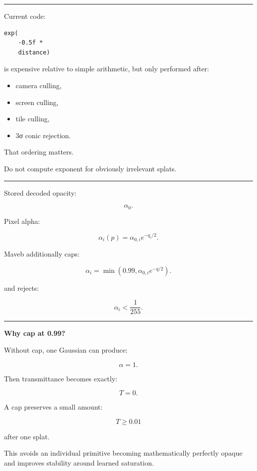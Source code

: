 \begin{center}\rule{0.5\linewidth}{0.5pt}\end{center}

Current code:

\begin{verbatim}
exp(
    -0.5f *
    distance)
\end{verbatim}

is expensive relative to simple arithmetic, but only performed after:

\begin{itemize}
\tightlist
\item
  camera culling,
\item
  screen culling,
\item
  tile culling,
\item
  3σ conic rejection.
\end{itemize}

That ordering matters.

Do not compute exponent for obviously irrelevant splats.

\begin{center}\rule{0.5\linewidth}{0.5pt}\end{center}

Stored decoded opacity:

\[
\alpha_0.
\]

Pixel alpha:

\[
\boxed{
\alpha_i(p)
=
\alpha_{0,i}
e^{-q_i/2}.
}
\]

Maveb additionally caps:

\[
\boxed{
\alpha_i
=
\min(
0.99,
\alpha_{0,i}e^{-q/2}
).
}
\]

and rejects:

\[
\alpha_i<\frac1{255}.
\]

\begin{center}\rule{0.5\linewidth}{0.5pt}\end{center}

\textbf{Why cap at 0.99?}

Without cap, one Gaussian can produce:

\[
\alpha=1.
\]

Then transmittance becomes exactly:

\[
T=0.
\]

A cap preserves a small amount:

\[
T\ge0.01
\]

after one splat.

This avoids an individual primitive becoming mathematically perfectly opaque and improves stability around learned saturation.

